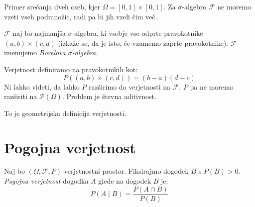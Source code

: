 \documentclass[12pt]{book}
\theoremstyle{definition}
\theoremstyle{plain}
\theoremstyle{plain}
\theoremstyle{plain}
\theoremstyle{remark}
\begin{document}
\begin{zgled}
    Primer srečanja dveh oseb, kjer $\Omega=[0,1] \times[0,1]$. Za $\sigma$-algebro $\mathcal{F}$ ne moremo vzeti vseh podmnožic, radi pa bi jih vzeli čim več.

    $\mathcal{F}$ naj bo najmanjša $\sigma$-algebra, ki vsebje vse odprte pravokotnike $(a, b)\times(c, d)$ (izkaže se, da je isto, če vzamemo zaprte pravokotnike). $\mathcal{F}$ imenujemo \emph{Borelova $\sigma$-algebra}.

    Verjetnost definiramo na pravokotnikih kot: 
    $$
    P((a, b) \times(c, d))=(b-a)(d-c)
    $$
    Ni lahko videti, da lahko $P$ razširimo do verjetnosti na $\mathcal{F}$. $P$ pa ne moremo razširiti na $\mathcal{P}(\Omega)$. Problem je števna aditivnost. 

    To je geometrijska definicija verjetnosti.
\end{zgled}

\chapter{Pogojna verjetnost}

Naj bo $(\Omega, \mathcal{F}, P)$ verjetnostni prostor. Fiksirajmo dogodek $B$ s $P(B) > 0$. \emph{Pogojna verjetnost} dogodka $A$ glede na dogodek $B$ je: 
$$
P(A \mid B)=\frac{P(A \cap B)}{P(B)}
$$
\end{document}
